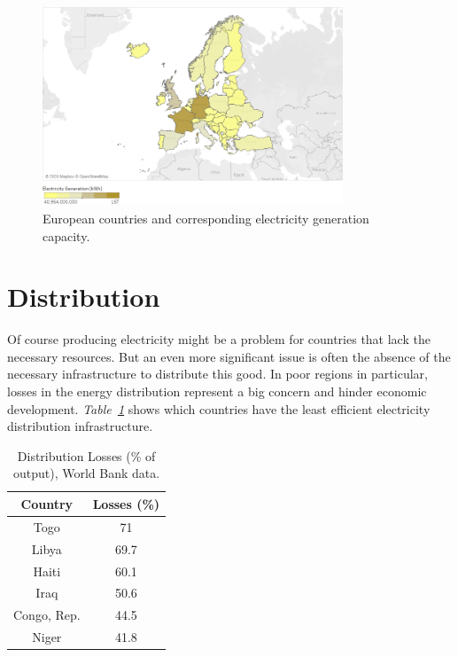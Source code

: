 \documentclass[a4paper,12pt]{book}
\begin{document}
\begin{figure}[tb]
\begin{center}
\captionsetup{justification=centering}
\includegraphics[width=0.8\textwidth]{Images/prod.png}
\caption{European countries and corresponding electricity generation capacity. }
\label{fig:capacity}
\end{center}
\end{figure}

\section{Distribution}

Of course producing electricity might be a problem for countries that lack the necessary resources. But an even more significant issue is often the absence of the necessary infrastructure to distribute this good. In poor regions in particular, losses in the energy distribution represent a big concern and hinder economic development. \textit{Table~\ref{fig:losses}} shows which countries have the least efficient electricity distribution infrastructure.

\begin{table}[hbt]
\begin{center}
\begin{tabular}{|c|c|}
\hline
Country & Losses (\%)\\
\hline
Togo & 71\\
Libya & 69.7\\
Haiti & 60.1\\
Iraq & 50.6\\
Congo, Rep. & 44.5\\
Niger & 41.8\\
\hline
\end{tabular}
\caption{Distribution Losses (\% of output), World Bank data.}
\label{fig:losses}
\end{center}
\end{table}
\end{document}
